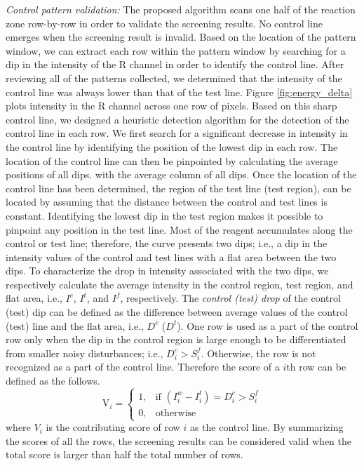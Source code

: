 \emph{Control pattern validation: }
The proposed algorithm scans one half of the reaction zone row-by-row in order to validate the screening results. No control line emerges when the screening result is invalid. Based on the location of the pattern window, we can extract each row within the pattern window by searching for a dip in the intensity of the R channel in order to identify the control line. After reviewing all of the patterns collected, we determined that the intensity of the control line was always lower than that of the test line. Figure \ref{fig:energy_delta} plots intensity in the R channel across one row of pixels. Based on this sharp control line, we designed a heuristic detection algorithm for the detection of the control line in each row. We first search for a significant decrease in intensity in the control line by identifying the position of the lowest dip in each row. The location of the control line can then be pinpointed by calculating the average positions of all dips. with the average column of all dips. Once the location of the control line has been determined, the region of the test line (test region), can be located by assuming that the distance between the control and test lines is constant. Identifying the lowest dip in the test region makes it possible to pinpoint any position in the test line. Most of the reagent accumulates along the control or test line; therefore, the curve presents two dips; i.e., a dip in the intensity values of the control and test lines with a flat area between the two dips. To characterize the drop in intensity associated with the two dips, we respectively calculate the average intensity in the control region, test region, and flat area, i.e., $I^c$, $I^t$, and $I^f$, respectively. The \emph{control (test) drop} of the control (test) dip can be defined as the difference between average values of the control (test) line and the flat area, i.e., $D^c$ ($D^t$). One row is used as a part of the control row only when the dip in the control region is large enough to be differentiated from smaller noisy disturbances; i.e., $D^c_i > S^f_i$. Otherwise, the row is not recognized as a part of the control line. Therefore the score of a $i$th row can be defined as the follows.
\begin{equation}
\label{eq:row_detect}
\text{V}_i = \begin{cases}
1, &\mbox{if } (I^w_i - I^t_i) = D^c_i > S^f_i \\
0, &\mbox{otherwise }
\end{cases}
\end{equation}
where $V_i$ is the contributing score of row $i$ as the control line. By summarizing the scores of all the rows, the screening results can be considered valid when the total score is larger than half the total number of rows.


